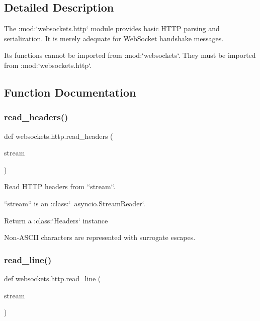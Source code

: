 \subsection{Detailed Description}
\begin{DoxyVerb}The :mod:`websockets.http` module provides basic HTTP parsing and
serialization. It is merely adequate for WebSocket handshake messages.

Its functions cannot be imported from :mod:`websockets`. They must be imported
from :mod:`websockets.http`.\end{DoxyVerb}
 

\subsection{Function Documentation}
\mbox{\label{namespacewebsockets_1_1http_a75fb58c62ddc81487e554a7798931adc}} 
\subsubsection{\texorpdfstring{read\+\_\+headers()}{read\_headers()}}
{\footnotesize\ttfamily def websockets.\+http.\+read\+\_\+headers (\begin{DoxyParamCaption}\item[{}]{stream }\end{DoxyParamCaption})}

\begin{DoxyVerb}Read HTTP headers from ``stream``.

``stream`` is an :class:`~asyncio.StreamReader`.

Return a :class:`Headers` instance

Non-ASCII characters are represented with surrogate escapes.\end{DoxyVerb}
 \mbox{\label{namespacewebsockets_1_1http_a0d3f313afb171e8b73c34410509e6ec1}} 
\subsubsection{\texorpdfstring{read\+\_\+line()}{read\_line()}}
{\footnotesize\ttfamily def websockets.\+http.\+read\+\_\+line (\begin{DoxyParamCaption}\item[{}]{stream }\end{DoxyParamCaption})}

